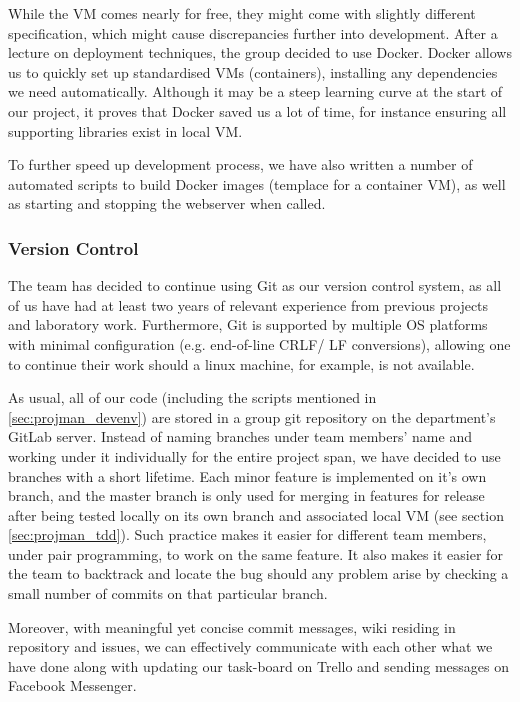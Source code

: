 \documentclass[a4paper, titlepage]{article}
\begin{document}
While the VM comes nearly for free, they might come with slightly different specification,
which might cause discrepancies further into development. After a lecture on deployment techniques, the group decided to use Docker. Docker allows us to quickly set up standardised VMs (containers), installing any dependencies we need automatically. Although it may be a steep learning curve at the start of our project, it proves that Docker saved us a lot of time, 
for instance ensuring all supporting libraries exist in local VM.

To further speed up development process, we have also written a number of automated scripts
to build Docker images (templace for a container VM), as well as starting and stopping the
webserver when called.

\subsubsection{Version Control}
The team has decided to continue using Git as our version control system, as all of us have had
at least two years of relevant experience from previous projects and laboratory work. Furthermore,
Git is supported by multiple OS platforms with minimal configuration (e.g. end-of-line CRLF/ LF conversions),
allowing one to continue their work should a linux machine, for example, is not available.

As usual, all of our code (including the scripts mentioned in \ref{sec:projman_devenv}) 
are stored in a group git repository on the department's GitLab server. Instead of naming branches under team members'
name and working under it individually for the entire project span, we have decided to use branches with a short lifetime.
Each minor feature is implemented on it's own branch, and the master branch is only used for merging in features for release
after being tested locally on its own branch and associated local VM (see section \ref{sec:projman_tdd}).
Such practice makes it easier for different team members, under pair programming, to work on the same feature.
It also makes it easier for the team to backtrack and locate the bug should any problem arise by checking a small number of commits on that particular branch.

Moreover, with meaningful yet concise commit messages, wiki residing in repository and issues, we can effectively
communicate with each other what we have done along with updating our task-board
on Trello and sending messages on Facebook Messenger.
\end{document}
